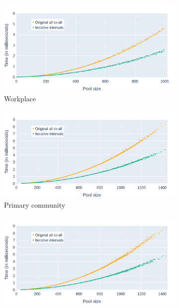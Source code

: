 \begin{figure}
    \centering
    \begin{subfigure}{.78\linewidth}
        \centering
        \includegraphics[width=\textwidth]{4 - Sampling/fig/iterative_intervals/times_avg_ii_workplace.png}
        \caption{Workplace}
        \label{fig:times_avg_ii_workplace}
    \end{subfigure}
    \begin{subfigure}{.78\linewidth}
        \centering
        \includegraphics[width=\textwidth]{4 - Sampling/fig/iterative_intervals/times_avg_ii_primary.png}
        \caption{Primary community}
        \label{fig:times_avg_ii_primary}
    \end{subfigure}
    \begin{subfigure}{.78\linewidth}
        \centering
        \includegraphics[width=\textwidth]{4 - Sampling/fig/iterative_intervals/times_avg_ii_secondary.png}

\end{subfigure}
\end{figure}
